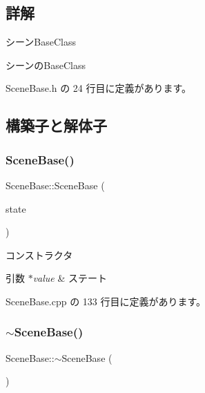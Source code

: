\subsection{詳解}
シーン\+Base\+Class 

シーンの\+Base\+Class 

 Scene\+Base.\+h の 24 行目に定義があります。



\subsection{構築子と解体子}
\mbox{\label{class_scene_base_aeafd60485ad8b2191f40da3013d50f2c}} 
\subsubsection{\texorpdfstring{Scene\+Base()}{SceneBase()}}
{\footnotesize\ttfamily Scene\+Base\+::\+Scene\+Base (\begin{DoxyParamCaption}\item[{\mbox{\hyperlink{class_scene_base_1_1_state_base}{State\+Base}} $\ast$}]{state }\end{DoxyParamCaption})}



コンストラクタ 


\begin{DoxyParams}{引数}
{\em $\ast$value} & ステート \\
\hline
\end{DoxyParams}


 Scene\+Base.\+cpp の 133 行目に定義があります。

\mbox{\label{class_scene_base_aab20c0332c7ecde0af12a4efe0e53781}} 
\subsubsection{\texorpdfstring{$\sim$\+Scene\+Base()}{~SceneBase()}}
{\footnotesize\ttfamily Scene\+Base\+::$\sim$\+Scene\+Base (\begin{DoxyParamCaption}{ }\end{DoxyParamCaption})\hspace{0.3cm}{\ttfamily [pure virtual]}}




